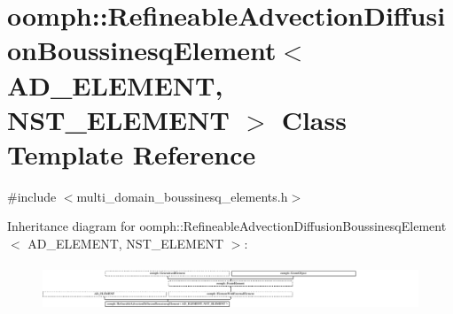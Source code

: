 \hypertarget{classoomph_1_1RefineableAdvectionDiffusionBoussinesqElement}{}\section{oomph\+:\+:Refineable\+Advection\+Diffusion\+Boussinesq\+Element$<$ A\+D\+\_\+\+E\+L\+E\+M\+E\+NT, N\+S\+T\+\_\+\+E\+L\+E\+M\+E\+NT $>$ Class Template Reference}
\label{classoomph_1_1RefineableAdvectionDiffusionBoussinesqElement}


{\ttfamily \#include $<$multi\+\_\+domain\+\_\+boussinesq\+\_\+elements.\+h$>$}

Inheritance diagram for oomph\+:\+:Refineable\+Advection\+Diffusion\+Boussinesq\+Element$<$ A\+D\+\_\+\+E\+L\+E\+M\+E\+NT, N\+S\+T\+\_\+\+E\+L\+E\+M\+E\+NT $>$\+:\begin{figure}[H]
\begin{center}
\leavevmode
\includegraphics[height=1.377614cm]{classoomph_1_1RefineableAdvectionDiffusionBoussinesqElement}
\end{center}
\end{figure}
